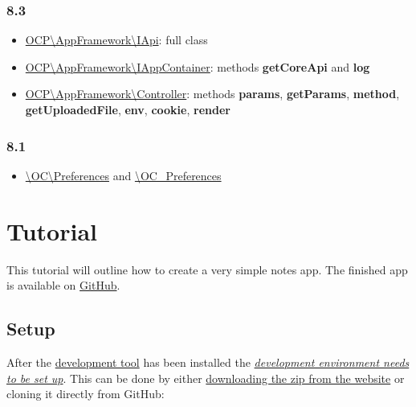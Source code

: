 \documentclass[letterpaper,10pt,english]{sphinxmanual}
\begin{document}
\subsubsection{8.3}
\label{app/changelog:id4}\begin{itemize}
\item {} 
\href{https://github.com/owncloud/core/blob/d59c4e832fea87d03d199a3211186a47fd252c32/lib/public/appframework/iapi.php}{OCP\textbackslash{}AppFramework\textbackslash{}IApi}: full class

\item {} 
\href{https://github.com/owncloud/core/blob/d59c4e832fea87d03d199a3211186a47fd252c32/lib/public/appframework/iappcontainer.php}{OCP\textbackslash{}AppFramework\textbackslash{}IAppContainer}: methods \textbf{getCoreApi} and \textbf{log}

\item {} 
\href{https://github.com/owncloud/core/blob/d59c4e832fea87d03d199a3211186a47fd252c32/lib/public/appframework/controller.php}{OCP\textbackslash{}AppFramework\textbackslash{}Controller}: methods \textbf{params}, \textbf{getParams}, \textbf{method}, \textbf{getUploadedFile}, \textbf{env}, \textbf{cookie}, \textbf{render}

\end{itemize}


\subsubsection{8.1}
\label{app/changelog:id5}\begin{itemize}
\item {} 
\href{https://github.com/owncloud/core/commit/909a53e087b7815ba9cd814eb6c22845ef5b48c7}{\textbackslash{}OC\textbackslash{}Preferences} and \href{https://github.com/owncloud/core/commit/4df7c0a1ed52ed1922116686cb5ad8da2544c997}{\textbackslash{}OC\_Preferences}

\end{itemize}


\section{Tutorial}
\label{app/tutorial::doc}\label{app/tutorial:tutorial}
This tutorial will outline how to create a very simple notes app. The finished app is available on \href{https://github.com/owncloud/app-tutorial\#tutorial}{GitHub}.


\subsection{Setup}
\label{app/tutorial:setup}
After the \href{https://github.com/owncloud/ocdev/blob/master/README.rst\#installation}{development tool} has been installed the {\hyperref[general/devenv::doc]{\emph{\emph{development environment needs to be set up}}}}. This can be done by either \href{https://owncloud.org/install/}{downloading the zip from the website} or cloning it directly from GitHub:
\end{document}
